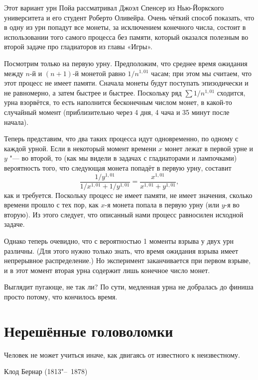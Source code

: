\documentclass[twoside]{book}
\begin{document}
Этот вариант урн Пойа рассматривал Джоэл Спенсер из Нью-Йоркского
университета и его студент Роберто Оливейра.
Очень чёткий способ
показать, что в одну из урн попадут все монеты, за исключением конечного
числа, состоит в использовании того самого процесса без памяти,
который оказался полезным во второй задаче про гладиаторов из главы
«\mbox{Игры}».

\medskip

Посмотрим только на первую урну.
Предположим, что среднее время
ожидания между $n$-й и $(n+1)$-й монетой равно $1/n^{1{,}01}$ часам;
при этом мы считаем, что этот процесс не имеет памяти.
Сначала монеты
будут поступать эпизодически и не равномерно, а затем быстрее и
быстрее.
Поскольку ряд $\sum 1/n^{1{,}01}$ сходится, урна взорвётся,
то есть наполнится бесконечным числом монет, в какой-то случайный
момент (приблизительно через 4 дня, 4 чача и 35 минут после начала).

Теперь представим, что два таких процесса идут одновременно, по одному
с каждой урной.
Если в некоторый момент времени $x$ монет лежат в
первой урне и $y$ "--- во второй, то (как мы видели в задачах с
гладиаторами и лампочками) вероятность того, что следующая монета
попадёт в первую урну, составит
\[\frac{1/y^{1{,}01}}{1/x^{1{,}01}+1/y^{1{,}01}}=\frac{x^{1{,}01}}{x^{1{,}01}+y^{1{,}01}},\]
как и требуется.
Поскольку процесс не имеет памяти, не имеет
значения, сколько времени прошло с тех пор, как $x$-я монета попала в
первую урну (или $y$-я во вторую).
Из этого следует, что описанный нами
процесс равносилен исходной задаче.

Однако теперь очевидно, что с вероятностью 1 моменты взрыва у двух урн различны.
(Для этого нужно только знать, что время ожидания взрыва имеет
непрерывное распределение.) 
Но эксперимент заканчивается при первом взрыве, и в этот момент вторая
урна содержит лишь конечное число монет.\heart

\medskip

Выглядит пугающе, не так ли?  По сути, медленная урна не добралась до
финиша просто потому, что кончилось время.

\chapter{Нерешённые головоломки}

\thispagestyle{empty}
\setlength{\epigraphwidth}{.55\textwidth}
\epigraph{Человек не может учиться иначе, как двигаясь от известного к неизвестному.\vspace{1ex}}{Клод Бернар (1813"--~1878)}
\end{document}
